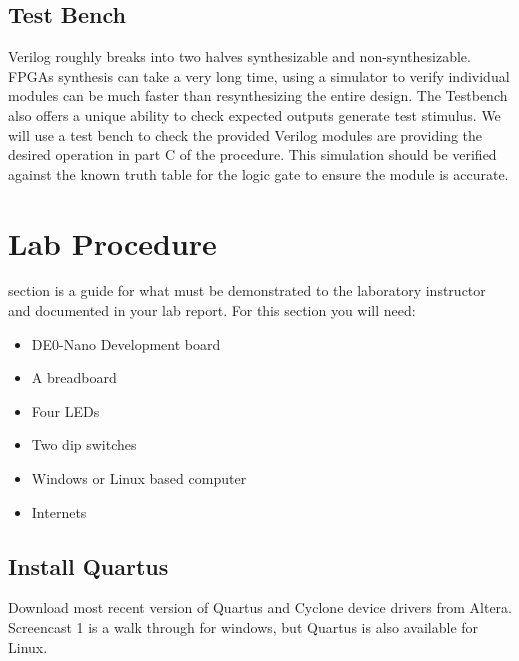 \documentclass[12pt,journal]{IEEEtran}
\begin{document}
    \subsection{\bfseries Test Bench}
      Verilog roughly breaks into two halves synthesizable and non-synthesizable. FPGAs synthesis can
      take a very long time, using a simulator to verify individual modules can be much faster than
      resynthesizing the entire design. The Testbench also offers a unique ability to check expected
      outputs generate test stimulus. We will use a test bench to check the provided Verilog modules
      are providing the desired operation in part C of the procedure. This simulation should be verified
      against the known truth table for the logic gate to ensure the module is accurate.

  \section{\bfseries Lab Procedure}
     section is a guide for what must be demonstrated to the laboratory instructor 
    and documented in your lab report. For this section you will need:
    \begin{itemize}
      \item DE0-Nano Development board
      \item A breadboard
      \item Four LEDs
      \item Two dip switches
      \item Windows or Linux based computer
      \item Internets
    \end{itemize}

    \subsection{\bfseries Install Quartus}
    Download most recent version of Quartus and Cyclone device drivers from Altera. Screencast 1
    is a walk through for windows, but Quartus is also available for Linux.

\end{document}
